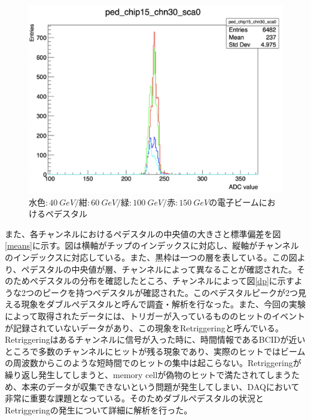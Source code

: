 \begin{figure}[H]
\begin{center}
 \includegraphics[keepaspectratio, scale=0.3]
 	{Figure/Beamtest/pedestal.png}
 		\caption[異なるビームエネルギーにおけるペデスタル]{$水色: \SI{40}{GeV}/紺: \SI{60}{GeV}/緑: \SI{100}{GeV}/赤: \SI{150}{GeV}$の電子ビームにおけるペデスタル}
		\label{pedestal}
\end{center}
\end{figure}
また、各チャンネルにおけるペデスタルの中央値の大きさと標準偏差を図\ref{means}に示す。図は横軸がチップのインデックスに対応し、縦軸がチャンネルのインデックスに対応している。また、黒枠は一つの層を表している。この図より、ペデスタルの中央値が層、チャンネルによって異なることが確認された。そのためぺデスタルの分布を確認したところ、チャンネルによって図\ref{dp}に示すような2つのピークを持つペデスタルが確認された。このペデスタルピークが2つ見える現象をダブルぺデスタルと呼んで調査・解析を行なった。また、今回の実験によって取得されたデータには、トリガーが入っているもののヒットのイベントが記録されていないデータがあり、この現象をRetriggeringと呼んでいる。Retriggeringはあるチャンネルに信号が入った時に、時間情報であるBCIDが近いところで多数のチャンネルにヒットが残る現象であり、実際のヒットではビームの周波数からこのような短時間でのヒットの集中は起こらない。Retriggeringが繰り返し発生してしまうと、memory cellが偽物のヒットで満たされてしまうため、本来のデータが収集できないという問題が発生してしまい、DAQにおいて非常に重要な課題となっている。そのためダブルぺデスタルの状況とRetriggeringの発生について詳細に解析を行った。\\

